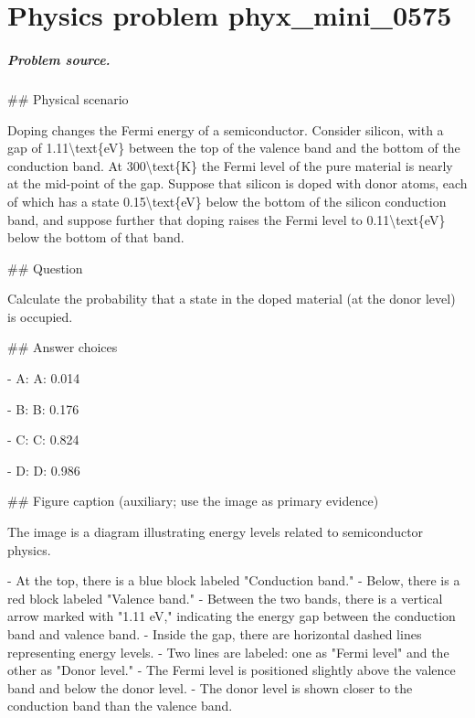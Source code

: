 
\chapter{Physics problem phyx\_mini\_0575}
\label{ch:PhyXMiniProblems_problem_phyx_mini_0575}

\paragraph{Problem source.}
\#\# Physical scenario

Doping changes the Fermi energy of a semiconductor. Consider silicon, with a gap of 1.11\textbackslash{}text\{eV\} between the top of the valence band and the bottom of the conduction band. At 300\textbackslash{}text\{K\} the Fermi level of the pure material is nearly at the mid-point of the gap. Suppose that silicon is doped with donor atoms, each of which has a state 0.15\textbackslash{}text\{eV\} below the bottom of the silicon conduction band, and suppose further that doping raises the Fermi level to 0.11\textbackslash{}text\{eV\} below the bottom of that band.

\#\# Question

Calculate the probability that a state in the doped material (at the donor level) is occupied.

\#\# Answer choices

- A: A: 0.014

- B: B: 0.176

- C: C: 0.824

- D: D: 0.986

\#\# Figure caption (auxiliary; use the image as primary evidence)

The image is a diagram illustrating energy levels related to semiconductor physics. 

- At the top, there is a blue block labeled "Conduction band."
- Below, there is a red block labeled "Valence band."
- Between the two bands, there is a vertical arrow marked with "1.11 eV," indicating the energy gap between the conduction band and valence band.
- Inside the gap, there are horizontal dashed lines representing energy levels.
- Two lines are labeled: one as "Fermi level" and the other as "Donor level."
- The Fermi level is positioned slightly above the valence band and below the donor level.
- The donor level is shown closer to the conduction band than the valence band.

